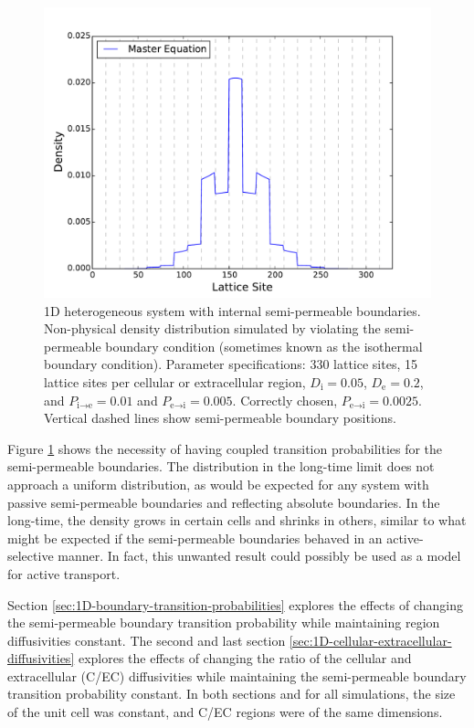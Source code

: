 	\begin{figure}[h]
		\centering
		\includegraphics[width=1.0\linewidth]{../images/1D/11U_heterogeneous_plots_1D_nonphysical}
		\caption[1D: Non-physical (undesirable) solution for a heterogeneous system]{1D heterogeneous system with internal semi-permeable boundaries. Non-physical density distribution simulated by violating the semi-permeable boundary condition (sometimes known as the isothermal boundary condition). Parameter specifications: 330 lattice sites, 15 lattice sites per cellular or extracellular region, $ D_\textrm{i} = 0.05 $, $ D_\textrm{e} = 0.2 $, and $ P_{\textrm{i}\rightarrow \textrm{e}} = 0.01 $ and $ P_{\textrm{e}\rightarrow \textrm{i}} =  0.005 $. Correctly chosen, $ P_{\textrm{e}\rightarrow \textrm{i}} =  0.0025 $. Vertical dashed lines show semi-permeable boundary positions. }
		\label{fig:11U_heterogeneous_plots_1D_nonphysical}
	\end{figure}
	
	\newpage
	Figure \ref{fig:11U_heterogeneous_plots_1D_nonphysical} shows the necessity of having coupled transition probabilities for the semi-permeable boundaries. The distribution in the long-time limit does not approach a uniform distribution, as would be expected for any system with passive semi-permeable boundaries and reflecting absolute boundaries. In the long-time, the density grows in certain cells and shrinks in others, similar to what might be expected if the semi-permeable boundaries behaved in an active-selective manner. In fact, this unwanted result could possibly be used as a model for active transport.
	
	Section \ref{sec:1D-boundary-transition-probabilities} explores the effects of changing the semi-permeable boundary transition probability while maintaining region diffusivities constant. The second and last section \ref{sec:1D-cellular-extracellular-diffusivities} explores the effects of changing the ratio of the cellular and extracellular (C/EC) diffusivities while maintaining the semi-permeable boundary transition probability constant. In both sections and for all simulations, the size of the unit cell was constant, and C/EC regions were of the same dimensions.
	
